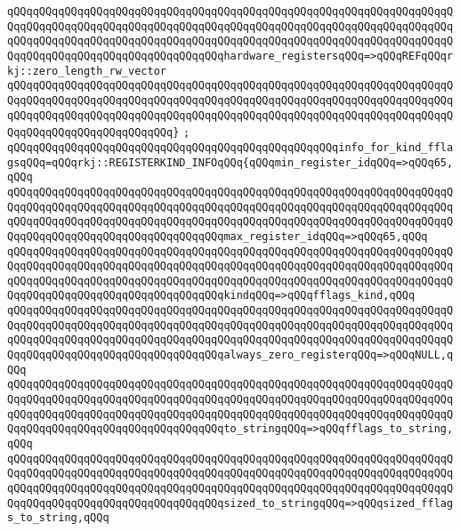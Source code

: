 \verb|qQQqqQQqqQQqqQQqqQQqqQQqqQQqqQQqqQQqqQQqqQQqqQQqqQQqqQQqqQQqqQQqqQQqqQQqqQQqqQQqqQQqqQQqqQQqqQQqqQQqqQQqqQQqqQQqqQQqqQQqqQQqqQQqqQQqqQQqqQQqqQQqqQQqqQQqqQQqqQQqqQQqqQQqqQQqqQQqqQQqqQQqqQQqqQQqqQQqqQQqqQQqqQQqqQQqqQQqqQQqqQQqqQQqqQQqqQQqqQQqqQQqhardware_registersqQQq=>qQQqREFqQQqrkj::zero_length_rw_vector|\newline
\verb|qQQqqQQqqQQqqQQqqQQqqQQqqQQqqQQqqQQqqQQqqQQqqQQqqQQqqQQqqQQqqQQqqQQqqQQqqQQqqQQqqQQqqQQqqQQqqQQqqQQqqQQqqQQqqQQqqQQqqQQqqQQqqQQqqQQqqQQqqQQqqQQqqQQqqQQqqQQqqQQqqQQqqQQqqQQqqQQqqQQqqQQqqQQqqQQqqQQqqQQqqQQqqQQqqQQqqQQqqQQqqQQqqQQqqQQqqQQq}|\newline
\verb|;|\newline
\verb|qQQqqQQqqQQqqQQqqQQqqQQqqQQqqQQqqQQqqQQqqQQqqQQqqQQqinfo_for_kind_fflagsqQQq=qQQqrkj::REGISTERKIND_INFOqQQq{qQQqmin_register_idqQQq=>qQQq65,qQQq|\newline
\verb|qQQqqQQqqQQqqQQqqQQqqQQqqQQqqQQqqQQqqQQqqQQqqQQqqQQqqQQqqQQqqQQqqQQqqQQqqQQqqQQqqQQqqQQqqQQqqQQqqQQqqQQqqQQqqQQqqQQqqQQqqQQqqQQqqQQqqQQqqQQqqQQqqQQqqQQqqQQqqQQqqQQqqQQqqQQqqQQqqQQqqQQqqQQqqQQqqQQqqQQqqQQqqQQqqQQqqQQqqQQqqQQqqQQqqQQqqQQqqQQqqQQqmax_register_idqQQq=>qQQq65,qQQq|\newline
\verb|qQQqqQQqqQQqqQQqqQQqqQQqqQQqqQQqqQQqqQQqqQQqqQQqqQQqqQQqqQQqqQQqqQQqqQQqqQQqqQQqqQQqqQQqqQQqqQQqqQQqqQQqqQQqqQQqqQQqqQQqqQQqqQQqqQQqqQQqqQQqqQQqqQQqqQQqqQQqqQQqqQQqqQQqqQQqqQQqqQQqqQQqqQQqqQQqqQQqqQQqqQQqqQQqqQQqqQQqqQQqqQQqqQQqqQQqqQQqqQQqqQQqkindqQQq=>qQQqfflags_kind,qQQq|\newline
\verb|qQQqqQQqqQQqqQQqqQQqqQQqqQQqqQQqqQQqqQQqqQQqqQQqqQQqqQQqqQQqqQQqqQQqqQQqqQQqqQQqqQQqqQQqqQQqqQQqqQQqqQQqqQQqqQQqqQQqqQQqqQQqqQQqqQQqqQQqqQQqqQQqqQQqqQQqqQQqqQQqqQQqqQQqqQQqqQQqqQQqqQQqqQQqqQQqqQQqqQQqqQQqqQQqqQQqqQQqqQQqqQQqqQQqqQQqqQQqqQQqqQQqalways_zero_registerqQQq=>qQQqNULL,qQQq|\newline
\verb|qQQqqQQqqQQqqQQqqQQqqQQqqQQqqQQqqQQqqQQqqQQqqQQqqQQqqQQqqQQqqQQqqQQqqQQqqQQqqQQqqQQqqQQqqQQqqQQqqQQqqQQqqQQqqQQqqQQqqQQqqQQqqQQqqQQqqQQqqQQqqQQqqQQqqQQqqQQqqQQqqQQqqQQqqQQqqQQqqQQqqQQqqQQqqQQqqQQqqQQqqQQqqQQqqQQqqQQqqQQqqQQqqQQqqQQqqQQqqQQqqQQqto_stringqQQq=>qQQqfflags_to_string,qQQq|\newline
\verb|qQQqqQQqqQQqqQQqqQQqqQQqqQQqqQQqqQQqqQQqqQQqqQQqqQQqqQQqqQQqqQQqqQQqqQQqqQQqqQQqqQQqqQQqqQQqqQQqqQQqqQQqqQQqqQQqqQQqqQQqqQQqqQQqqQQqqQQqqQQqqQQqqQQqqQQqqQQqqQQqqQQqqQQqqQQqqQQqqQQqqQQqqQQqqQQqqQQqqQQqqQQqqQQqqQQqqQQqqQQqqQQqqQQqqQQqqQQqqQQqqQQqsized_to_stringqQQq=>qQQqsized_fflags_to_string,qQQq|\newline
